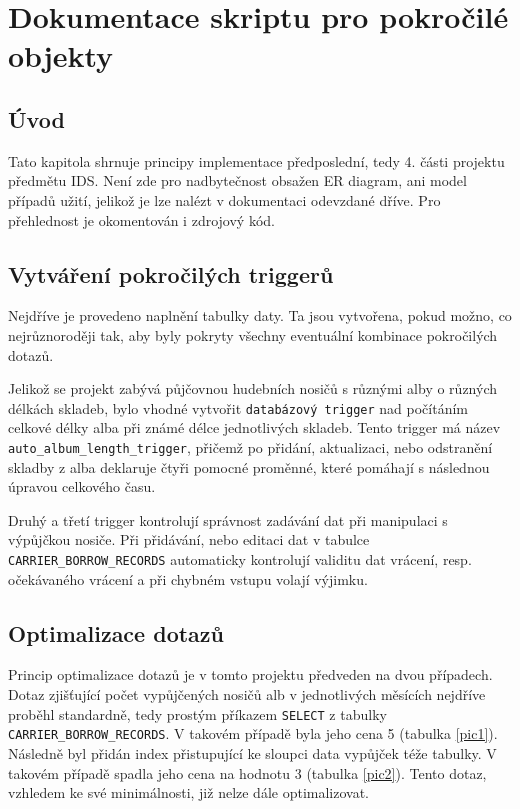 \section{Dokumentace skriptu pro pokročilé objekty}
\subsection{Úvod}
Tato kapitola shrnuje principy implementace předposlední, tedy 4. části projektu předmětu IDS. Není zde pro nadbytečnost obsažen ER diagram, ani model případů užití, jelikož je lze nalézt v dokumentaci odevzdané dříve. Pro přehlednost je okomentován i zdrojový kód.

\subsection{Vytváření pokročilých triggerů}
Nejdříve je provedeno naplnění tabulky daty. Ta jsou vytvořena, pokud možno, co nejrůznoroději tak, aby byly pokryty všechny eventuální kombinace pokročilých dotazů.

Jelikož se projekt zabývá půjčovnou hudebních nosičů s různými alby o různých délkách skladeb, bylo vhodné vytvořit \texttt{databázový trigger} nad počítáním celkové délky alba při známé délce jednotlivých skladeb. Tento trigger má název \texttt{auto\_album\_length\_trigger}, přičemž po přidání, aktualizaci, nebo odstranění skladby z alba deklaruje čtyři pomocné proměnné, které pomáhají s následnou úpravou celkového času.

Druhý a třetí trigger kontrolují správnost zadávání dat při manipulaci s výpůjčkou nosiče. Při přidávání, nebo editaci dat v tabulce \texttt{CARRIER\_BORROW\_RECORDS} automaticky kontrolují validitu dat vrácení, resp. očekávaného vrácení a při chybném vstupu volají výjimku.




\subsection{Optimalizace dotazů}
Princip optimalizace dotazů je v tomto projektu předveden na dvou případech. Dotaz zjišťující počet vypůjčených nosičů alb v jednotlivých měsících nejdříve proběhl standardně, tedy prostým příkazem \texttt{SELECT} z tabulky \texttt{CARRIER\_BORROW\_RECORDS}. V takovém případě byla jeho cena 5 (tabulka \ref{pic1}). Následně byl přidán index přistupující ke sloupci data vypůjček téže tabulky. V takovém případě spadla jeho cena na hodnotu 3 (tabulka \ref{pic2}). Tento dotaz, vzhledem ke své minimálnosti, již nelze dále optimalizovat.

